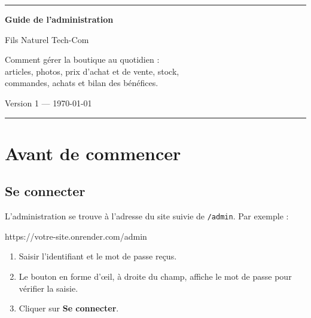 \documentclass[11pt,a4paper]{article}
\newcommand{\bouton}[1]{\textbf{\textcolor{sig}{#1}}}
\begin{document}
\begin{titlepage}
\centering
\vspace*{3cm}
{\color{sig}\rule{4cm}{2pt}}\par
\vspace{1.2cm}
{\Huge\bfseries Guide de l'administration\par}
\vspace{0.8cm}
{\LARGE Fils Naturel Tech-Com\par}
\vspace{2.5cm}
{\large Comment gérer la boutique au quotidien :\\
articles, photos, prix d'achat et de vente, stock,\\
commandes, achats et bilan des bénéfices.\par}
\vfill
{\color{encre2}\large Version 1 — \today\par}
\vspace{0.5cm}
{\color{sig}\rule{4cm}{2pt}}\par
\end{titlepage}

\tableofcontents
\newpage

\section{Avant de commencer}

\subsection{Se connecter}

L'administration se trouve à l'adresse du site suivie de \texttt{/admin}. Par
exemple :

\begin{center}\ttfamily https://votre-site.onrender.com/admin\end{center}

\begin{enumerate}
  \item Saisir l'identifiant et le mot de passe reçus.
  \item Le bouton en forme d'\oe il, à droite du champ, affiche le mot de passe
        pour vérifier la saisie.
  \item Cliquer sur \bouton{Se connecter}.
\end{enumerate}
\end{document}
